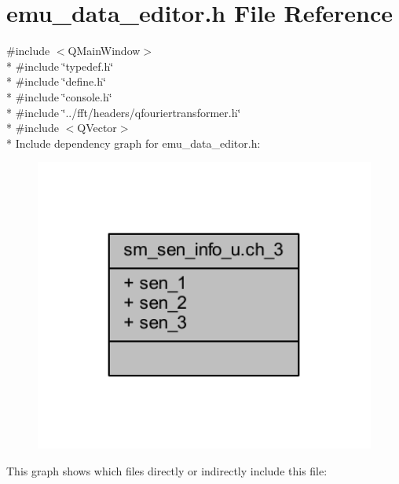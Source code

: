 \hypertarget{a00094}{\section{emu\+\_\+data\+\_\+editor.\+h File Reference}
\label{a00094}
}
{\ttfamily \#include $<$Q\+Main\+Window$>$}\\*
{\ttfamily \#include \char`\"{}typedef.\+h\char`\"{}}\\*
{\ttfamily \#include \char`\"{}define.\+h\char`\"{}}\\*
{\ttfamily \#include \char`\"{}console.\+h\char`\"{}}\\*
{\ttfamily \#include \char`\"{}../fft/headers/qfouriertransformer.\+h\char`\"{}}\\*
{\ttfamily \#include $<$Q\+Vector$>$}\\*
Include dependency graph for emu\+\_\+data\+\_\+editor.\+h\+:
\nopagebreak
\begin{figure}[H]
\begin{center}
\leavevmode
\includegraphics[width=350pt]{d7/d03/a00254}
\end{center}
\end{figure}
This graph shows which files directly or indirectly include this file\+:
\nopagebreak
